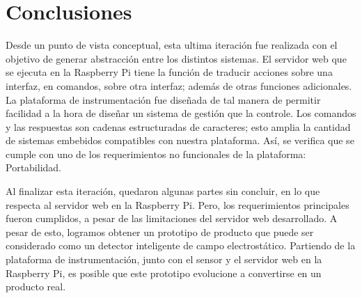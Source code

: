 
\section{Conclusiones} %
\label{it7:sec:conclusiones}

Desde un punto de vista conceptual, esta ultima iteración fue realizada con el objetivo de generar abstracción entre los distintos sistemas. El servidor web que se ejecuta en la Raspberry Pi tiene la función de traducir acciones sobre una interfaz, en comandos, sobre otra interfaz; además de otras funciones adicionales. La plataforma de instrumentación fue diseñada de tal manera de permitir facilidad a la hora de diseñar un sistema de gestión que la controle. Los comandos y las respuestas son cadenas estructuradas de caracteres; esto amplia la cantidad de sistemas embebidos compatibles con nuestra plataforma. Así, se verifica que se cumple con uno de los requerimientos no funcionales de la plataforma: Portabilidad.

Al finalizar esta iteración, quedaron algunas partes sin concluir, en lo que respecta al servidor web en la Raspberry Pi. Pero, los requerimientos principales fueron cumplidos, a pesar de las limitaciones del servidor web desarrollado.
A pesar de esto, logramos obtener un prototipo de producto que puede ser considerado como un detector inteligente de campo electrostático. Partiendo de la plataforma de instrumentación, junto con el sensor y el servidor web en la Raspberry Pi, es posible que este prototipo evolucione a convertirse en un producto real.



